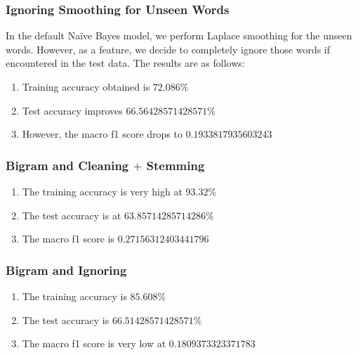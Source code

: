 \documentclass[11pt]{article}
\begin{document}
\subsubsection{Ignoring Smoothing for Unseen Words}
In the default Na\"{i}ve Bayes model, we perform Laplace smoothing for the unseen words. However, as a feature, we decide to completely ignore those words if encountered in the test data. The results are as follows:
\begin{enumerate}
  \item Training accuracy obtained is $72.086\%$
  \item Test accuracy improves $66.56428571428571\%$
  \item However, the macro f1 score drops to $0.1933817935603243$
\end{enumerate}

\subsubsection{Bigram and Cleaning $+$ Stemming}
\begin{enumerate}
  \item The training accuracy is very high at $93.32\%$
  \item The test accuracy is at $63.85714285714286\%$
  \item The macro f1 score is $0.27156312403441796$
\end{enumerate}

\subsubsection{Bigram and Ignoring}
\begin{enumerate}
  \item The training accuracy is $85.608\%$
  \item The test accuracy is $66.51428571428571\%$
  \item The macro f1 score is very low at $0.1809373323371783$
\end{enumerate}
\end{document}
